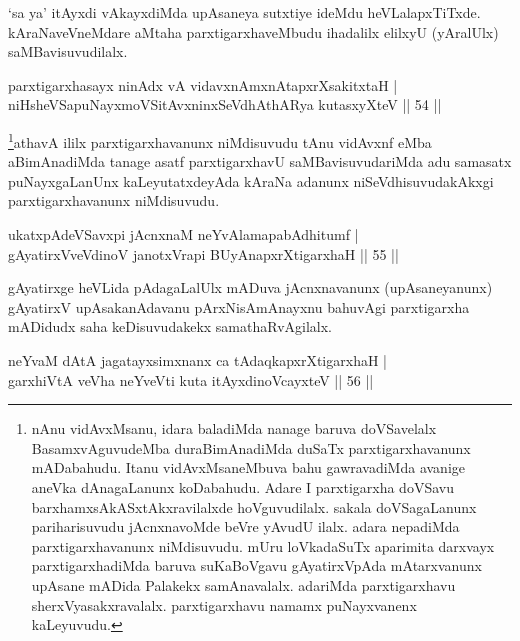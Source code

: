 \begin{artha} 
`sa ya' itAyxdi vAkayxdiMda upAsaneya sutxtiye ideMdu heVLalapxTiTxde. 
kAraNaveVneMdare aMtaha parxtigarxhaveMbudu ihadalilx elilxyU 
(yAralUlx) saMBavisuvudilalx.
\end{artha}


\begin{shl}
parxtigarxhasayx ninAdx vA vidavxnAmxnAtapxrXsakitxtaH | \\
niHsheVSapuNayxmoVSitAvxninxSeVdhAthARya kutasxyXteV \hfill ||  54 || 
\end{shl}

\begin{artha} 
\footnote{nAnu vidAvxMsanu, idara baladiMda nanage baruva 
doVSavelalx BasamxvAguvudeMba duraBimAnadiMda duSaTx 
parxtigarxhavanunx mADabahudu. Itanu vidAvxMsaneMbuva bahu 
gawravadiMda avanige aneVka dAnagaLanunx koDabahudu. Adare I 
parxtigarxha doVSavu barxhamxsAkASxtAkxravilalxde hoVguvudilalx. 
sakala doVSagaLanunx pariharisuvudu jAcnxnavoMde beVre yAvudU ilalx. 
adara nepadiMda parxtigarxhavanunx niMdisuvudu. mUru loVkadaSuTx 
aparimita darxvayx parxtigarxhadiMda baruva suKaBoVgavu gAyatirxVpAda 
mAtarxvanunx upAsane mADida Palakekx samAnavalalx. adariMda 
parxtigarxhavu sherxVyasakxravalalx. parxtigarxhavu namamx 
puNayxvanenx kaLeyuvudu.}athavA ililx parxtigarxhavanunx niMdisuvudu tAnu 
vidAvxnf eMba aBimAnadiMda tanage asatf parxtigarxhavU 
saMBavisuvudariMda adu samasatx puNayxgaLanUnx kaLeyutatxdeyAda kAraNa 
adanunx niSeVdhisuvudakAkxgi parxtigarxhavanunx niMdisuvudu.
\end{artha}

\begin{shl}
ukatxpAdeVSavxpi jAcnxnaM neYvAlamapabAdhitumf | \\
gAyatirxVveVdinoV janotxVrapi BUyAnapxrXtigarxhaH \hfill ||  55 || 
\end{shl}

\begin{artha} 
gAyatirxge heVLida pAdagaLalUlx mADuva jAcnxnavanunx (upAsaneyanunx) 
gAyatirxV upAsakanAdavanu pArxNisAmAnayxnu bahuvAgi parxtigarxha 
mADidudx saha keDisuvudakekx samathaRvAgilalx.
\end{artha}


\begin{shl}
neYvaM dAtA jagatayxsimxnanx ca tAdaqkapxrXtigarxhaH | \\
garxhiVtA veVha neYveVti kuta itAyxdinoVcayxteV \hfill ||  56 ||
\end{shl}


